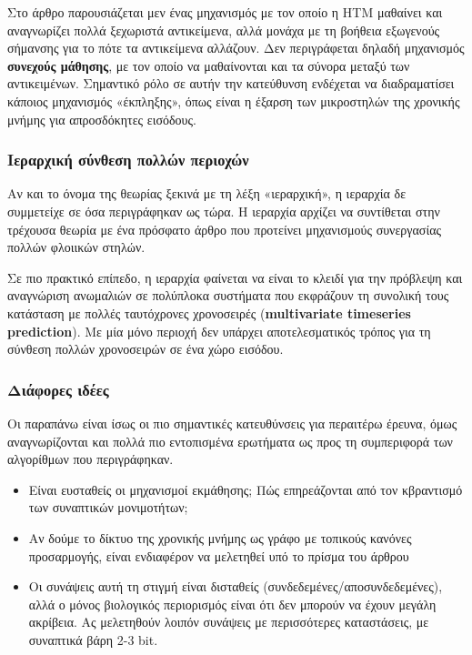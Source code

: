 	Στο άρθρο \cite{hawkinsTheoryHowColumns2017} παρουσιάζεται μεν ένας μηχανισμός με τον οποίο η HTM μαθαίνει και αναγνωρίζει πολλά ξεχωριστά αντικείμενα,
	αλλά μονάχα με τη βοήθεια εξωγενούς σήμανσης για το πότε τα αντικείμενα αλλάζουν.
	Δεν περιγράφεται δηλαδή μηχανισμός \textbf{συνεχούς μάθησης}, με τον οποίο να μαθαίνονται και τα σύνορα μεταξύ των αντικειμένων.
	Σημαντικό ρόλο σε αυτήν την κατεύθυνση ενδέχεται να διαδραματίσει κάποιος μηχανισμός «έκπληξης», όπως είναι η έξαρση των μικροστηλών της χρονικής μνήμης
	για απροσδόκητες εισόδους.

\subsubsection{Ιεραρχική σύνθεση πολλών περιοχών}

	Αν και το όνομα της θεωρίας ξεκινά με τη λέξη «ιεραρχική», η ιεραρχία δε συμμετείχε σε όσα περιγράφηκαν ως τώρα.
	Η ιεραρχία αρχίζει να συντίθεται στην τρέχουσα θεωρία με ένα πρόσφατο άρθρο \cite{hawkinsFrameworkIntelligenceCortical2019}
	που προτείνει μηχανισμούς συνεργασίας πολλών φλοιικών στηλών.

	Σε πιο πρακτικό επίπεδο, η ιεραρχία φαίνεται να είναι το κλειδί για την πρόβλεψη και αναγνώριση ανωμαλιών σε πολύπλοκα συστήματα
	που εκφράζουν τη συνολική τους κατάσταση με πολλές ταυτόχρονες χρονοσειρές (\textbf{multivariate timeseries prediction}).
	Με μία μόνο περιοχή δεν υπάρχει αποτελεσματικός τρόπος για τη σύνθεση πολλών χρονοσειρών σε ένα χώρο εισόδου.

\subsubsection{Διάφορες ιδέες}

	Οι παραπάνω είναι ίσως οι πιο σημαντικές κατευθύνσεις για περαιτέρω έρευνα, όμως αναγνωρίζονται και πολλά πιο εντοπισμένα ερωτήματα
	ως προς τη συμπεριφορά των αλγορίθμων που περιγράφηκαν.
	\begin{itemize}
		\item Είναι ευσταθείς οι μηχανισμοί εκμάθησης; Πώς επηρεάζονται από τον κβραντισμό των συναπτικών μονιμοτήτων;
		\item Αν δούμε το δίκτυο της χρονικής μνήμης ως γράφο με τοπικούς κανόνες προσαρμογής, είναι ενδιαφέρον να μελετηθεί υπό το πρίσμα του άρθρου \cite{kipouridisConvergenceNetworkSystems2019}
		\item Οι συνάψεις αυτή τη στιγμή είναι δισταθείς (συνδεδεμένες/αποσυνδεδεμένες), αλλά ο μόνος βιολογικός περιορισμός είναι ότι δεν μπορούν να έχουν μεγάλη ακρίβεια.
		Ας μελετηθούν λοιπόν συνάψεις με περισσότερες καταστάσεις, με συναπτικά βάρη 2-3 bit.
	\end{itemize}

